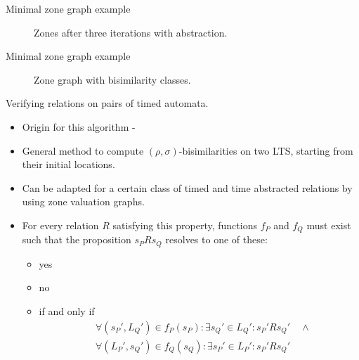 \documentclass{beamer}
\begin{document}
\begin{frame}[shrink=20]{Minimal zone graph example}
  \begin{figure}
    \centering
    \def\svgwidth{1.2\columnwidth}
    
    \caption{Zones after three iterations with abstraction.}
  \end{figure}
\end{frame}

\begin{frame}[shrink=60]{Minimal zone graph example}
  \begin{figure}
    \centering
    \def\svgwidth{2.7\columnwidth}
    
    \caption{Zone graph with bisimilarity classes.}
  \end{figure}
\end{frame}

\begin{frame}{Verifying relations on pairs of timed automata.}
  \begin{itemize}
  \item Origin for this algorithm - \cite{arun2006bisimilarities} 
  \item General method to compute $(\rho, \sigma)$-bisimilarities on
    two LTS, starting from their initial locations.
  \item Can be adapted for a certain class of timed and time
    abstracted relations by using zone valuation graphs.
  \item For every relation $R$ satisfying this property, functions
    $f_P$ and $f_Q$ must exist such that the proposition $s_P R s_Q$
    resolves to one of these:
    \begin{itemize}
    \item yes
    \item no
    \item if and only if 
      \begin{align*} 
        &\forall (s_P', L_Q') \in f_P(s_P): \exists s_Q' \in
        L_Q': s_P' R s_Q' \quad \wedge \\
        &\forall (L_P', s_Q') \in f_Q(s_Q): \exists s_P' \in
        L_P': s_P' R s_Q'
      \end{align*} 
    \end{itemize}
  \end{itemize}
\end{frame}
\end{document}
